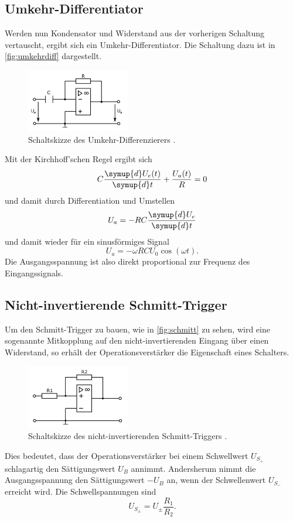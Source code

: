 \subsection{Umkehr-Differentiator}
Werden nun Kondensator und Widerstand aus der vorherigen Schaltung vertauscht, ergibt sich 
ein Umkehr-Differentiator. Die Schaltung dazu ist in \autoref{fig:umkehrdiff}
dargestellt.
\begin{figure}[H]
    \centering
    \includegraphics[width=0.4\textwidth]{diff.png}
    \caption{Schaltskizze des Umkehr-Differenzierers \cite{anleitung}.}
    \label{fig:umkehrdiff}
\end{figure}
Mit der Kirchhoff'schen Regel ergibt sich
\begin{equation*}
    C \frac{\symup{d} U_e(t)}{\symup{d} t} + \frac{U_a(t)}{R} = 0
\end{equation*}
und damit durch Differentiation und Umstellen
\begin{equation*}
    U_a = - R C \frac{\symup{d}U_e}{\symup{d} t}
\end{equation*}
und damit wieder für ein sinusförmiges Signal 
\begin{equation*}
    U_a = - \omega R C U_0 \cos(\omega t).
\end{equation*}
Die Ausgangsspannung ist also direkt proportional zur Frequenz des Eingangssignals.

\subsection{Nicht-invertierende Schmitt-Trigger}
Um den Schmitt-Trigger zu bauen, wie in \autoref{fig:schmitt} zu sehen, wird eine sogenannte
Mitkopplung auf den nicht-invertierenden Eingang über einen Widerstand, so erhält der
Operationsverstärker die Eigenschaft eines Schalters.
\begin{figure}[H]
    \centering
    \includegraphics[width=0.4\textwidth]{schmitt.png}
    \caption{Schaltskizze des nicht-invertierenden Schmitt-Triggers \cite{anleitung}.}
    \label{fig:schmitt}
\end{figure}
Dies bedeutet, dass der Operationsverstärker
bei einem Schwellwert $U_{S_{+}}$ schlagartig den Sättigungswert $U_B$ annimmt.
Andersherum nimmt die Ausgangsspannung den Sättigungswert $-U_B$ an, wenn der Schwellenwert 
$U_{S_{-}}$ erreicht wird. Die Schwellspannungen sind 
\begin{equation*}
    U_{S_{\pm}} = U_{\pm} \frac{R_1}{R_2}.
\end{equation*}

